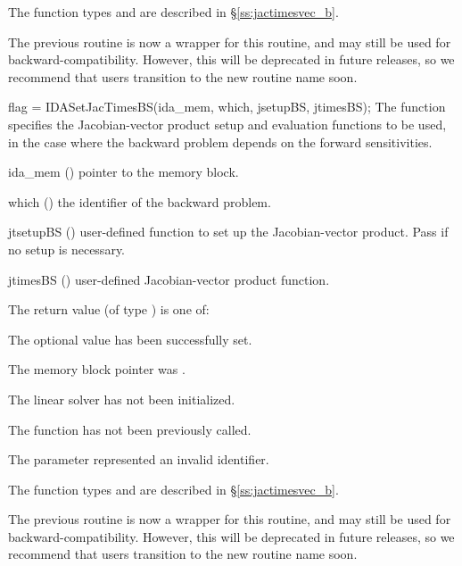 {
  The function types  and
   are described in \S\ref{ss:jactimesvec_b}.

  The previous routine  is now a wrapper for this
  routine, and may still be used for backward-compatibility.  However,
  this will be deprecated in future releases, so we recommend that
  users transition to the new routine name soon.
}
{
  flag = IDASetJacTimesBS(ida\_mem, which, jsetupBS, jtimesBS);
}
{
  The function  specifies the Jacobian-vector
  product setup and evaluation functions to be used, in the case where the
  backward problem depends on the forward sensitivities.
}
{
  \begin{args}
  \item[ida\_mem] ()
    pointer to the {\idas} memory block.
  \item[which] ()
    the identifier of the backward problem.
  \item[jtsetupBS] ()
    user-defined function to set up the Jacobian-vector product.
    Pass  if no setup is necessary.
  \item[jtimesBS] ()
    user-defined Jacobian-vector product function.
  \end{args}
}
{
  The return value  (of type ) is one of:
  \begin{args}
  \item[\Id{IDALS\_SUCCESS}]
    The optional value has been successfully set.
  \item[\Id{IDALS\_MEM\_NULL}]
    The  memory block pointer was .
  \item[\Id{IDALS\_LMEM\_NULL}]
    The {\idals} linear solver has not been initialized.
  \item[\Id{IDALS\_NO\_ADJ}]
    The function  has not been previously called.
  \item[\Id{IDALS\_ILL\_INPUT}]
    The parameter  represented an invalid identifier.
  \end{args}
}
{
  The function types  and
   are described in
  \S\ref{ss:jactimesvec_b}.

  The previous routine  is now a wrapper for this
  routine, and may still be used for backward-compatibility.  However,
  this will be deprecated in future releases, so we recommend that
  users transition to the new routine name soon.
}

